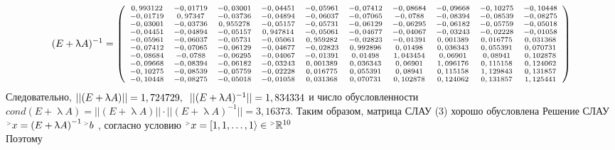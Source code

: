 \documentclass[12pt]{article}
\begin{document}
\begin{equation*}
	\scriptsize
	(E + \uplambda A)^{-1} =
	\left(
	\begin{array}{cccccccccc}
0,993122 & -0,01719 & -0,03001 & -0,04451 & -0,05961 & -0,07412 & -0,08684 & -0,09668 & -0,10275 & -0,10448 \\
-0,01719 & 0,97347 & -0,03736 & -0,04894 & -0,06037 & -0,07065 & -0,0788 & -0,08394 & -0,08539 & -0,08275 \\
-0,03001 & -0,03736 & 0,955278 & -0,05157 & -0,05731 & -0,06129 & -0,06295 & -0,06182 & -0,05759 & -0,05018 \\
-0,04451 & -0,04894 & -0,05157 & 0,947814 & -0,05061 & -0,04677 & -0,04067 & -0,03243 & -0,02228 & -0,01058 \\
-0,05961 & -0,06037 & -0,05731 & -0,05061 & 0,959282 & -0,02823 & -0,01391 & 0,001389 & 0,016775 & 0,031368 \\
-0,07412 & -0,07065 & -0,06129 & -0,04677 & -0,02823 & 0,992896 & 0,01498 & 0,036343 & 0,055391 & 0,070731 \\
-0,08684 & -0,0788 & -0,06295 & -0,04067 & -0,01391 & 0,01498 & 1,043454 & 0,06901 & 0,08941 & 0,102878 \\
-0,09668 & -0,08394 & -0,06182 & -0,03243 & 0,001389 & 0,036343 & 0,06901 & 1,096176 & 0,115158 & 0,124062 \\
-0,10275 & -0,08539 & -0,05759 & -0,02228 & 0,016775 & 0,055391 & 0,08941 & 0,115158 & 1,129843 & 0,131857 \\
-0,10448 & -0,08275 & -0,05018 & -0,01058 & 0,031368 & 0,070731 & 0,102878 & 0,124062 & 0,131857 & 1,125441 
	\end{array}
	\right)
\end{equation*}
Следовательно, $||(E + \uplambda A)|| = 1,724729 , \hspace{0.2cm}
 ||(E + \uplambda A)^{-1}||=1,834334$ и число обусловленности
 $cond(E + \uplambda A) = ||(E + \uplambda A)|| \cdot ||(E + \uplambda A)^{-1}|| = 3,16373$.
 Таким образом, матрица СЛАУ (3)
 хорошо обусловлена
\vskip 0.7cm
Решение СЛАУ
$ {}^{\mathsmaller{>}} x = \left(E + \uplambda A  \right) ^{-1} 
{}^{\mathsmaller{>}} b $ , согласно условию 
${}^{\mathsmaller{>}} x = [1,1,\dots,1\rangle \in {}^{\mathsmaller{>}}
\mathbb{R}^{10}
$ \\
Поэтому
\end{document}
